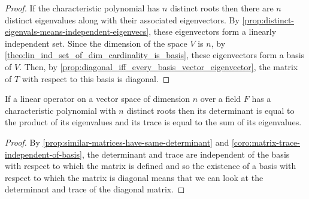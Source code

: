 \documentclass[MathsNotesBase.tex]{subfiles}
\begin{document}
{		\bigskip
		\begin{proof}
			If the characteristic polynomial has $n$ distinct roots then there are $n$ distinct eigenvalues along with their associated eigenvectors. By \autoref{prop:distinct-eigenvals-means-independent-eigenvecs}, these eigenvectors form a linearly independent set. Since the dimension of the space $V$ is $n$, by \autoref{theo:lin_ind_set_of_dim_cardinality_is_basis}, these eigenvectors form a basis of $V$. Then, by \autoref{prop:diagonal_iff_every_basis_vector_eigenvector}, the matrix of $T$ with respect to this basis is diagonal.
		\end{proof}
	
		\bigskip{}
		\begin{corollary}
			If a linear operator on a vector space of dimension $n$ over a field $F$ has a characteristic polynomial with $n$ distinct roots then its determinant is equal to the product of its eigenvalues and its trace is equal to the sum of its eigenvalues.
		\end{corollary}
		\begin{proof}
			By \autoref{prop:similar-matrices-have-same-determinant} and \autoref{coro:matrix-trace-independent-of-basis}, the determinant and trace are independent of the basis with respect to which the matrix is defined and so the existence of a basis with respect to which the matrix is diagonal means that we can look at the determinant and trace of the diagonal matrix.
		\end{proof}
	
}
\end{document}
